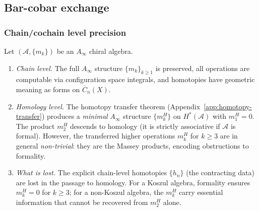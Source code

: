 \subsection{Bar-cobar exchange}

\subsubsection{Chain/cochain level precision}

\begin{theorem}
\label{thm:chain-vs-homology}
Let $(\mathcal{A}, \{m_k\})$ be an $A_\infty$ chiral algebra.
\begin{enumerate}[label=\textup{(\roman*)}]
\item \emph{Chain level.}
  The full $A_\infty$ structure $\{m_k\}_{k \geq 1}$ is preserved,
  all operations are computable via configuration space integrals,
  and homotopies have geometric meaning as forms on
  $\overline{C}_n(X)$.
\item \emph{Homology level.}
  The homotopy transfer theorem
  (Appendix~\ref{app:homotopy-transfer}) produces a \emph{minimal}
  $A_\infty$ structure $\{m_k^H\}$ on $H^*(\mathcal{A})$ with
  $m_1^H = 0$.  The product $m_2^H$ descends to homology
  (it is strictly associative if $\mathcal{A}$ is formal).
  However, the transferred higher operations
  $m_k^H$ for $k \geq 3$ are in general \emph{non-trivial}:
  they are the Massey products, encoding obstructions to formality.
\item \emph{What is lost.}
  The explicit chain-level homotopies $\{h_n\}$ (the contracting
  data) are lost in the passage to homology.  For a Koszul algebra,
  formality ensures $m_k^H = 0$ for $k \geq 3$; for a non-Koszul
  algebra, the $m_k^H$ carry essential information that cannot be
  recovered from $m_2^H$ alone.
\end{enumerate}
\end{theorem}

